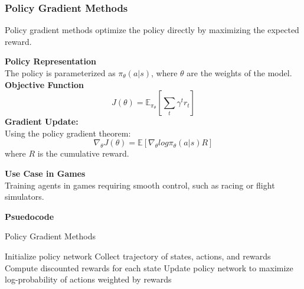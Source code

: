 \documentclass[12pt,oneside,openright,a4paper]{cpe-english-project}
\begin{document}
\subsubsection{Policy Gradient Methods}
Policy gradient methods optimize the policy directly by maximizing the expected reward.\par
\textbf{Policy Representation} \\
The policy is parameterized as $\pi_{\theta}(a|s)$, where $\theta$ are the weights of the model. \\
\textbf{Objective Function}
\begin{equation}
J(\theta) = \mathbb{E}_{\pi_{\theta}}[\sum_{t} \gamma^{t}r_{t}]
\end{equation}
\textbf{Gradient Update:} \\
Using the policy gradient theorem:
\begin{equation}
\nabla_{\theta}J(\theta) = \mathbb{E}[\nabla_{\theta}log\pi_{\theta}(a|s)R]
\end{equation}
where $R$ is the cumulative reward.\par
\textbf{Use Case in Games} \\
Training agents in games requiring smooth control, such as racing or flight simulators.\par
\textbf{Psuedocode}
\begin{algorithm}
\caption{Policy Gradient Methods}\label{alg:PGM}
\begin{algorithmic}
\State Initialize policy network
\State Collect trajectory of states, actions, and rewards
\State Compute discounted rewards for each state
\State Update policy network to maximize log-probability of actions weighted by rewards
\EndFor
\end{algorithmic}
\end{algorithm}
\end{document}
